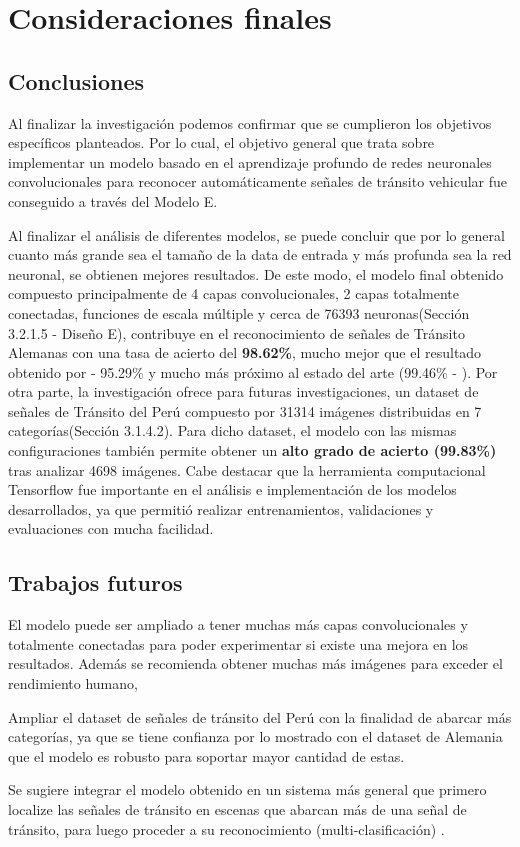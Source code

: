 \chapter{Consideraciones finales}
\setcounter{page}{132}
\renewcommand{\baselinestretch}{2} %
\textheight 21cm

\section{Conclusiones}

	Al finalizar la investigación podemos confirmar que se cumplieron los objetivos específicos planteados. Por lo cual, el objetivo general que trata sobre implementar un modelo basado en el aprendizaje profundo de redes neuronales convolucionales para reconocer automáticamente señales de tránsito vehicular fue conseguido a través del Modelo E.

	\vskip 0.2cm
	Al finalizar el análisis de diferentes modelos, se puede concluir que por lo general cuanto más grande sea el tamaño de la data de entrada y más profunda sea la red neuronal, se obtienen mejores resultados. De este modo, el modelo final obtenido compuesto principalmente de 4 capas convolucionales, 2 capas totalmente conectadas, funciones de escala múltiple y cerca de 76393 neuronas(Sección 3.2.1.5 - Diseño E), contribuye en el reconocimiento de señales de Tránsito Alemanas con una tasa de acierto del {\bf 98.62\%}, mucho mejor que el resultado obtenido por \citep{Ayuque2016} - 95.29\% y mucho más próximo al estado del arte (99.46\% - \citep{Ciresan}).
	\vskip 0.2cm
	Por otra parte, la investigación ofrece para futuras investigaciones, un dataset de señales de Tránsito del Perú compuesto por 31314 imágenes distribuidas en 7 categorías(Sección 3.1.4.2). Para dicho dataset, el modelo con las mismas configuraciones también permite obtener un {\bf alto grado de acierto (99.83\%)} tras analizar 4698 imágenes. 
	\vskip 0.2cm
	Cabe destacar que la herramienta computacional Tensorflow fue importante en el análisis e implementación de los modelos desarrollados, ya que permitió realizar entrenamientos, validaciones y evaluaciones con mucha facilidad. 


\section{Trabajos futuros}


	El modelo puede ser ampliado a tener muchas más capas convolucionales y totalmente conectadas para poder experimentar si existe una mejora en los resultados. Además se recomienda obtener muchas más imágenes para exceder el rendimiento humano, \citep{Goodfellow-et-al-2016}

	Ampliar el dataset de señales de tránsito del Perú con la finalidad de abarcar más categorías, ya que se tiene confianza por lo mostrado con el dataset de Alemania que el modelo es robusto para soportar mayor cantidad de estas.
	
	Se sugiere integrar el modelo obtenido en un sistema más general que primero localize las señales de tránsito en escenas que abarcan más de una señal de tránsito, para luego proceder a su reconocimiento (multi-clasificación) .
\newpage